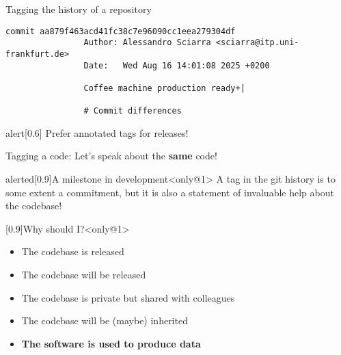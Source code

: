\documentclass[usenames,svgnames,14pt]{beamer}
\begin{document}
\begin{frame}[fragile]{Tagging the history of a repository}
\begin{overlayarea}{\textwidth}{0.7\textheight}
\begin{onlyenv}
\begin{lstlisting}[style=MyBash, aboveskip=7mm]
                commit aa879f463acd41fc38c7e96090cc1eea279304df
                Author: Alessandro Sciarra <sciarra@itp.uni-frankfurt.de>
                Date:   Wed Aug 16 14:01:08 2025 +0200

                Coffee machine production ready+|

                # Commit differences
            \end{lstlisting}
            \begin{varblock}{alert}[0.6\textwidth]{}
                \alert{Prefer annotated tags for releases!}
            \end{varblock}
        \end{onlyenv}
    \end{overlayarea}
\end{frame}
\begin{frame}[fragile]{Tagging a code: Let's speak about the \textbf{same} code!}
    \vspace{-3mm}
    \begin{varblock}{alerted}[0.9\textwidth]{A milestone in development}<only@1>
        A tag in the git history is to some extent a commitment, but it is also a statement of invaluable help about the codebase!
    \end{varblock}
    \begin{varblock}{}[0.9\textwidth]{Why should I?}<only@1>
        \begin{itemize}
            \item The codebase is released
            \item The codebase will be released
            \item The codebase is  private but shared with colleagues
            \item The codebase will be (maybe) inherited
            \item \textbf{The software is used to produce data}
        \end{itemize}
    \end{varblock}
\end{frame}


\end{document}
